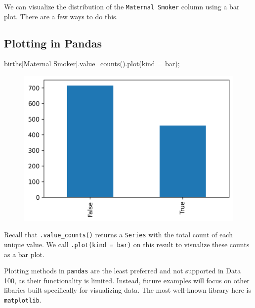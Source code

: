\documentclass[
  letterpaper,
  DIV=11,
  numbers=noendperiod]{scrreprt}
\newenvironment{Shaded}{\begin{snugshade}}{\end{snugshade}}
\newcommand{\NormalTok}[1]{\textcolor[rgb]{0.00,0.23,0.31}{#1}}
\newcommand{\OperatorTok}[1]{\textcolor[rgb]{0.37,0.37,0.37}{#1}}
\newcommand{\StringTok}[1]{\textcolor[rgb]{0.13,0.47,0.30}{#1}}
\begin{document}
We can visualize the distribution of the \texttt{Maternal\ Smoker}
column using a bar plot. There are a few ways to do this.

\hypertarget{plotting-in-pandas}{%
\subsection{Plotting in Pandas}\label{plotting-in-pandas}}

\begin{Shaded}
\begin{Highlighting}[]
\NormalTok{births[}\StringTok{\textquotesingle{}Maternal Smoker\textquotesingle{}}\NormalTok{].value\_counts().plot(kind }\OperatorTok{=} \StringTok{\textquotesingle{}bar\textquotesingle{}}\NormalTok{)}\OperatorTok{;}
\end{Highlighting}
\end{Shaded}

\begin{figure}[H]

{\centering \includegraphics{visualization_1/visualization_1_files/figure-pdf/cell-3-output-1.png}

}

\end{figure}

Recall that \texttt{.value\_counts()} returns a \texttt{Series} with the
total count of each unique value. We call
\texttt{.plot(kind\ =\ \textquotesingle{}bar\textquotesingle{})} on this
result to visualize these counts as a bar plot.

Plotting methods in \texttt{pandas} are the least preferred and not
supported in Data 100, as their functionality is limited. Instead,
future examples will focus on other libaries built specifically for
visualizing data. The most well-known library here is
\texttt{matplotlib}.
\end{document}
